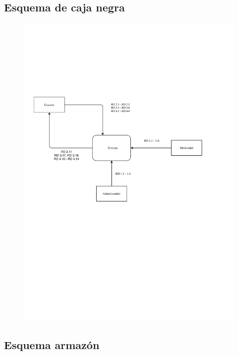 \subsection{Esquema de caja negra}

\begin{figure}[H]
  \centering
  \includegraphics{diagramas/Caja_negra.pdf}
\end{figure}

\subsection{Esquema armazón}

